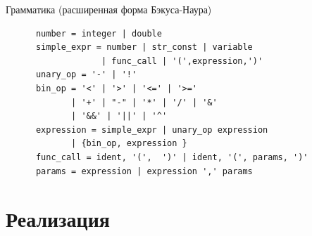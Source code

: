 \documentclass[xcolor=pdftex, dvipsnames, table]{beamer}
\begin{document}
\begin{frame}[fragile]
  \begin{block}{Грамматика (расширенная форма Бэкуса-Наура)}
    \begin{verbatim}
      number = integer | double
      simple_expr = number | str_const | variable
                   | func_call | '(',expression,')'
      unary_op = '-' | '!'
      bin_op = '<' | '>' | '<=' | '>='
             | '+' | "-" | '*' | '/' | '&'
             | '&&' | '||' | '^'
      expression = simple_expr | unary_op expression
             | {bin_op, expression }
      func_call = ident, '(',  ')' | ident, '(', params, ')'
      params = expression | expression ',' params
    \end{verbatim}
  \end{block}
\end{frame}

\section{Реализация}
\end{document}
